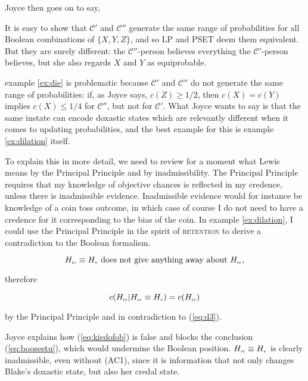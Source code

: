 \documentclass[11pt]{article}
\begin{document}
Joyce then goes on to say,

\begin{quotex}
  It is easy to show that $\mathcal{C}'$ and $\mathcal{C}''$ generate
  the same range of probabilities for all Boolean combinations of
  $\{X,Y,Z\}$, and so LP and PSET deem them equivalent. But they are
  surely different: the $\mathcal{C}''$-person believes everything the
  $\mathcal{C}'$-person believes, but she also regards $X$ and $Y$ as
  equiprobable.
\end{quotex}

example \ref{ex:die} is problematic because $\mathcal{C}'$ and
$\mathcal{C}''$ do not generate the same range of probabilities: if,
as Joyce says, $c(Z)\geq1/2$, then $c(X)=c(Y)$ implies $c(X)\leq{}1/4$
for $\mathcal{C}''$, but not for $\mathcal{C}'$. What Joyce wants to
say is that the same instate can encode doxastic states which are
relevantly different when it comes to updating probabilities, and the
best example for this is example \ref{ex:dilation} itself.

To explain this in more detail, we need to review for a moment what
Lewis means by the Principal Principle and by inadmissibility. The
Principal Principle requires that my knowledge of objective chances is
reflected in my credence, unless there is inadmissible evidence.
Inadmissible evidence would for instance be knowledge of a coin toss
outcome, in which case of course I do not need to have a credence for
it corresponding to the bias of the coin. In example
\ref{ex:dilation}, I could use the Principal Principle in the spirit
of \textsc{retention} to derive a contradiction to the Boolean
formalism. 

\begin{equation}
  \label{eq:kiedofob}
H_{\mbox{\tiny{iv}}}\equiv{}H_{\mbox{\tiny{v}}}\mbox{ does not give anything away about }H_{\mbox{\tiny{iv}}}, 
\end{equation}

{\noindent}therefore

\begin{equation}
  \label{eq:booseetu}
c(H_{\mbox{\tiny{iv}}}|H_{\mbox{\tiny{iv}}}\equiv{}H_{\mbox{\tiny{v}}})=c(H_{\mbox{\tiny{iv}}})  
\end{equation}

{\noindent}by the Principal Principle and in contradiction to (\ref{eq:d3}).

Joyce explains how (\ref{eq:kiedofob}) is false and blocks the
conclusion (\ref{eq:booseetu}), which would undermine the Boolean
position. $H_{\mbox{\tiny{iv}}}\equiv{}H_{\mbox{\tiny{v}}}$ is clearly
inadmissible, even without (AC1), since it is information that not
only changes Blake's doxastic state, but also her credal
state.
\end{document}

